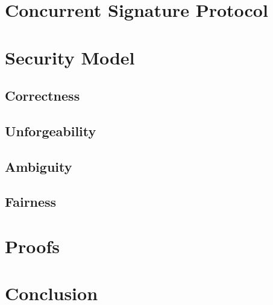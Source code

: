 \documentclass{beamer}
\begin{document}
\section{Concurrent Signature Protocol}


\section{Security Model}


\subsection{Correctness}


\subsection{Unforgeability}


\subsection{Ambiguity}


\subsection{Fairness}


\section{Proofs}


\section{Conclusion}

\end{document}
